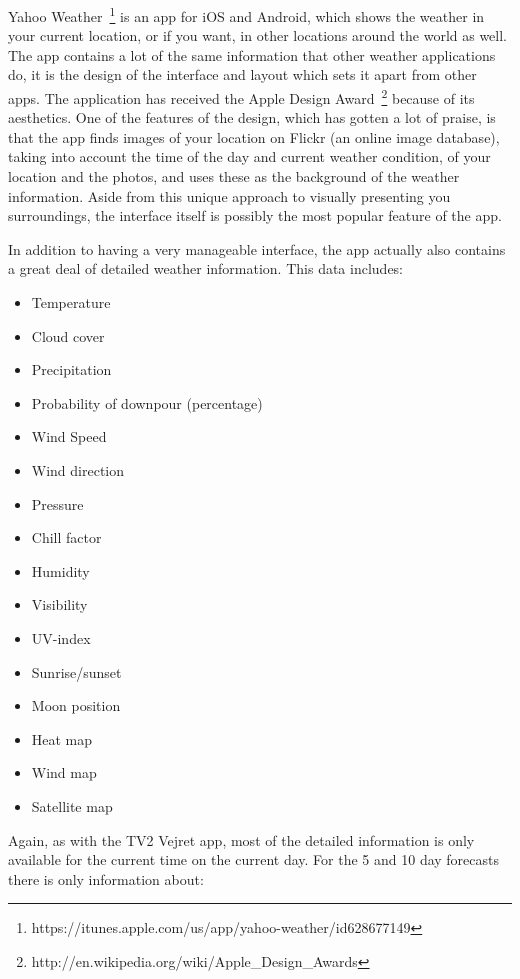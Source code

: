 Yahoo Weather~\footnote{https://itunes.apple.com/us/app/yahoo-weather/id628677149} is an app for iOS and Android, which shows the weather in your current location, or if you want, in other locations around the world as well.
The app contains a lot of the same information that other weather applications do, it is the design of the interface and layout which sets it apart from other apps. 
The application has received the Apple Design Award~\footnote{http://en.wikipedia.org/wiki/Apple\_Design\_Awards} because of its aesthetics. 
One of the features of the design, which has gotten a lot of praise, is that the app finds images of your location on Flickr (an online image database), taking into account the time of the day and current weather condition, of your location and the photos, and uses these as the background of the weather information. 
Aside from this unique approach to visually presenting you surroundings, the interface itself is possibly the most popular feature of the app.

\pagebreak
In addition to having a very manageable interface, the app actually also contains a great deal of detailed weather information. This data includes:

\begin{itemize}
    \item Temperature
    \item Cloud cover
    \item Precipitation
    \item Probability of downpour (percentage)
    \item Wind Speed
    \item Wind direction
    \item Pressure
    \item Chill factor
    \item Humidity
    \item Visibility
    \item UV-index
    \item Sunrise/sunset
    \item Moon position
    \item Heat map
    \item Wind map
    \item Satellite map
\end{itemize}

Again, as with the TV2 Vejret app, most of the detailed information is only available for the current time on the current day. 
For the 5 and 10 day forecasts there is only information about:

